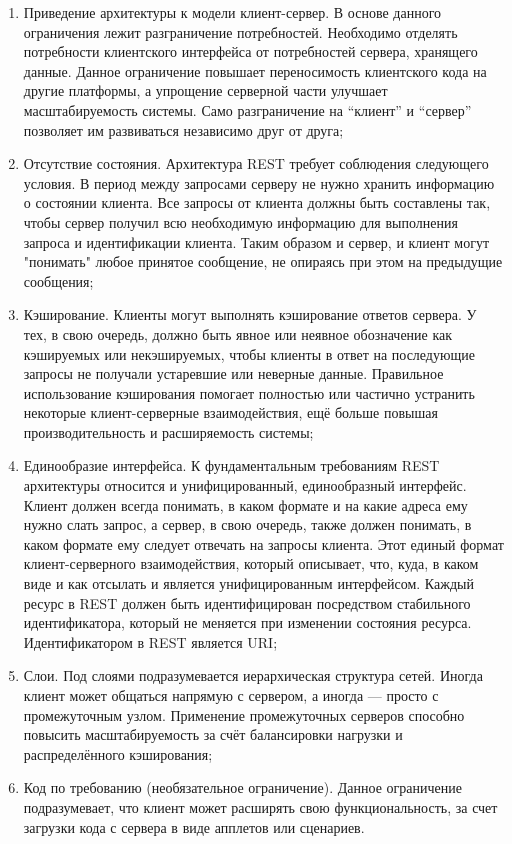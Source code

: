 \begin{enumerate}
	\item Приведение архитектуры к модели клиент-сервер. В основе данного ограничения лежит разграничение потребностей. Необходимо отделять потребности клиентского интерфейса от потребностей сервера, хранящего данные. Данное ограничение повышает переносимость клиентского кода на другие платформы, а упрощение серверной части улучшает масштабируемость системы. Само разграничение на “клиент” и “сервер” позволяет им развиваться независимо друг от друга; 
	\item Отсутствие состояния. Архитектура REST требует соблюдения следующего условия. В период между запросами серверу не нужно хранить информацию о состоянии клиента. Все запросы от клиента должны быть составлены так, чтобы сервер получил всю необходимую информацию для выполнения запроса и идентификации клиента. Таким образом и сервер, и клиент могут "понимать" любое принятое сообщение, не опираясь при этом на предыдущие сообщения; 
	\item Кэширование. Клиенты могут выполнять кэширование ответов сервера. У тех, в свою очередь, должно быть явное или неявное обозначение как кэшируемых или некэшируемых, чтобы клиенты в ответ на последующие запросы не получали устаревшие или неверные данные. Правильное использование кэширования помогает полностью или частично устранить некоторые клиент-серверные взаимодействия, ещё больше повышая производительность и расширяемость системы;
	\item Единообразие интерфейса. К фундаментальным требованиям REST архитектуры относится и унифицированный, единообразный интерфейс. Клиент должен всегда понимать, в каком формате и на какие адреса ему нужно слать запрос, а сервер, в свою очередь, также должен понимать, в каком формате ему следует отвечать на запросы клиента. Этот единый формат клиент-серверного взаимодействия, который описывает, что, куда, в каком виде и как отсылать и является унифицированным интерфейсом. Каждый ресурс в REST должен быть идентифицирован посредством стабильного идентификатора, который не меняется при изменении состояния ресурса. Идентификатором в REST является URI;
	\item Слои. Под слоями подразумевается иерархическая структура сетей. Иногда клиент может общаться напрямую с сервером, а иногда — просто с промежуточным узлом. Применение промежуточных серверов способно повысить масштабируемость за счёт балансировки нагрузки и распределённого кэширования; 
	\item Код по требованию (необязательное ограничение). Данное ограничение подразумевает, что клиент может расширять свою функциональность, за счет загрузки кода с сервера в виде апплетов или сценариев. 
\end{enumerate}
